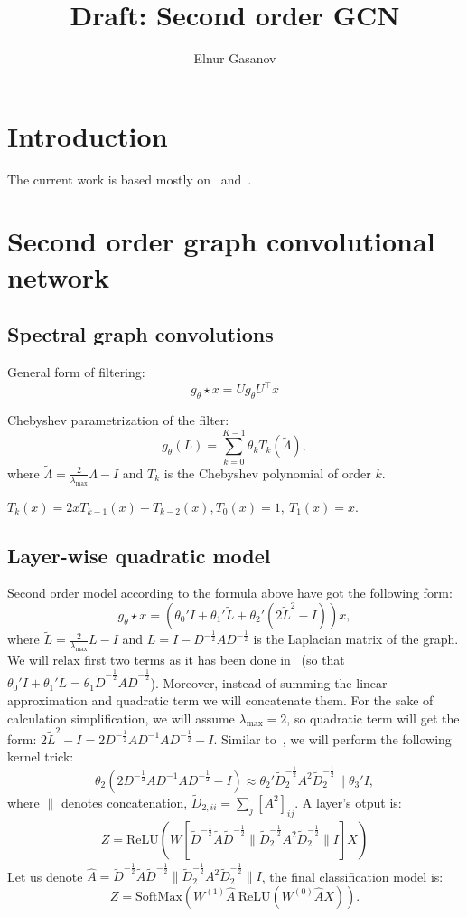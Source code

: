 \documentclass{article}
\title{Draft: Second order GCN}
\date{}
\author{Elnur Gasanov}
\begin{document}
\maketitle
\section{Introduction}

The current work is based mostly on~\cite{CNN_LSF} and~\cite{GCN}.

\section{Second order graph convolutional network}
\subsection{Spectral graph convolutions}

General form of filtering:
\[
g_\theta \star x = Ug_\theta U^\top x 
\]

Chebyshev parametrization of the filter:
\[
g_\theta(L) = \sum\limits_{k=0}^{K-1} \theta_k T_k(\tilde{\Lambda}),
\]
where $\tilde{\Lambda} = \frac{2}{\lambda_{\max}} \Lambda - I$ and  $T_k$ is the Chebyshev polynomial of order $k$. 

$T_k(x) = 2 x T_{k-1}(x) - T_{k-2}(x), T_0(x) = 1, \ T_1(x) = x$. 
\subsection{Layer-wise quadratic model}
Second order model according to the formula above have got the following form:
\[
g_\theta \star x = (\theta_0' I + \theta_1' \tilde{L} + \theta_2' (2 \tilde{L}^2 - I))x, 
\]
where $\tilde{L} = \frac{2}{\lambda_{\max}} L - I$ and $L = I - D^{-\frac12} A D^{-\frac12}$ is the Laplacian matrix of the graph. We will relax first two terms as it has been done in~\cite{GCN} (so that $\theta_0' I + \theta_1' \tilde{L} = \theta_1 \tilde{D}^{-\frac12} \tilde{A} \tilde{D}^{-\frac12} $). Moreover, instead of summing the linear approximation and quadratic term we will concatenate them. For the sake of calculation simplification, we will assume $\lambda_{\max} = 2$, so quadratic term will get the form: $ 2 \tilde{L}^2 - I = 2 D^{-\frac12} A D^{-1} A D^{-\frac12} - I$. Similar to~\cite{GCN}, we will perform the following kernel trick:
$$
\theta_2 (2 D^{-\frac12} A D^{-1} A D^{-\frac12} - I) \approx \theta_2' \tilde{D}_2^{-\frac12} A^2 \tilde{D}_2^{-\frac12} \| \theta_3'I,
$$
where $\|$ denotes concatenation, $\tilde{D}_{2, ii} = \sum_j [A^2]_{ij}$. A layer's otput is:
\begin{align*}
Z = \text{ReLU} (W [\tilde{D}^{-\frac12} \tilde{A} \tilde{D}^{-\frac12} \| \tilde{D}_2^{-\frac12} A^2 \tilde{D}_2^{-\frac12}  \| I ] X)
\end{align*}
Let us denote $\hat{A} = \tilde{D}^{-\frac12} \tilde{A} \tilde{D}^{-\frac12} \| \tilde{D}_2^{-\frac12} A^2 \tilde{D}_2^{-\frac12}  \| I$, the final classification model is:
$$
Z = \text{SoftMax}(W^{(1)} \hat{A} \ \text{ReLU} (W^{(0)} \hat{A} X)). 
$$



\end{document}
